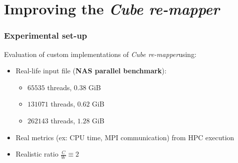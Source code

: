 \documentclass[slidestop,xcolor=dvipsnames, notes=hide]{beamer}
\newcommand{\toolTargetSoftware}			{\emph{Cube re-mapper}}
\begin{document}
\section{Improving the \protect\toolTargetSoftware\space}
		\begin{frame}
			\frametitle{Experimental set-up}
			\centering
			Evaluation of custom implementations of \toolTargetSoftware\space using:
			\begin{itemize}
				\item Real-life input file (\textbf{NAS parallel benchmark}):
					\begin{itemize}
						\item  $65535$ threads, $0.38$ GiB
						\item $131071$ threads, $0.62$ GiB
						\item $262143$ threads, $1.28$ GiB
					\end{itemize}
				\item Real metrics (ex: CPU time, MPI communication) from HPC execution
				\item Realistic ratio $\frac{C}{W} \equiv 2$
			\end{itemize}

		\end{frame}

\end{document}
